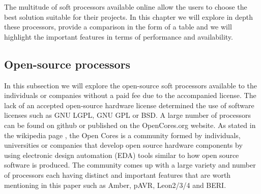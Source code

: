 \hspace{0.5cm} The multitude of soft processors available online allow the users to choose the best
solution suitable for their projects. In this chapter we will explore in depth these processors,
provide a comparison in the form of a table and we will highlight the important features in
terms of performance and availability.

\subsection{Open-source processors}

\hspace{0.5cm} In this subsection we will explore the open-source soft processors available to the
individuals or companies without a paid fee due to the accompanied license. The lack of an
accepted open-source hardware license determined the use of software licenses such as GNU
LGPL, GNU GPL or BSD. A large number of processors can be found on github or published 
on the OpenCores.org website. As stated in the wikipedia page \cite{11}, the Open Cores is a
community formed by individuals, universities or companies that develop open source
hardware components by using electronic design automation (EDA) tools similar to how
open source software is produced. The community comes up with a large variety and number
of processors each having distinct and important features that are worth mentioning in this
paper such as Amber, pAVR, Leon2/3/4 and BERI.

